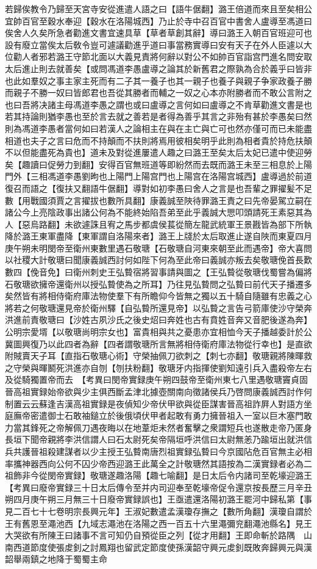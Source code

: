 若歸俟教令乃歸至天宮寺安從進遣人語之曰【語牛倨翻】潞王倍道而來且至矣相公宜帥百官至穀水奉迎【穀水在洛陽城西】乃止於寺中召百官中書舍人盧導至馮道曰俟舍人久矣所急者勸進文書宜速具草【草者草創其辭】導曰潞王入朝百官班迎可也設有廢立當俟太后敎令豈可遽議勸進乎道曰事當務實導曰安有天子在外人臣遽以大位勸人者邪若潞王守節北面以大義見責將何辭以對公不如帥百官詣宫門進名問安取太后進止則去就善矣【或問馮道李愚盧導之論其於新舊君之際孰為合於義乎曰皆非也此如羣奴之事主家主死而有二子其一養子也其一親子也養子與親子争家政養子勝而親子不勝一奴曰皆郎君也吾從其勝者而輔之一奴之心本亦附勝者而不敢公言附之也曰吾將决諸主母馮道李愚之謂也或曰盧導之言何如曰盧導之不肯草勸進文書是也若其持論則猶李愚也至於言去就之善若是者得為善乎其言之非殆有甚於李愚矣曰然則為馮道李愚者當何如曰若漢人之論相主在與在主亡與亡可也然亦僅可而已未能盡相道也夫子之言曰危而不持顛而不扶則將焉用彼相矣明乎此則為相者貴於持危扶顛不以但能盡死為貴也】道未及對從進屢遣人趣之曰潞王至矣太后太妃已遣中使迎勞矣【趣讀曰促勞力到翻】安得百官無班道等即紛然而去既而潞王未至三相息於上陽門外【三相馮道李愚劉昫也上陽門上陽宫門也上陽宫在洛陽宫城西】盧導過於前道復召而語之【復扶又翻語牛倨翻】導對如初李愚曰舍人之言是也吾輩之罪擢髪不足數【用戰國須賈之言擢拔也數所具翻】康義誠至陜待罪潞王責之曰先帝晏駕立嗣在諸公今上亮陰政事出諸公何為不能終始陷吾弟至此乎義誠大愳叩頭請死王素惡其為人【惡烏路翻】未欲遽誅且宥之馬步都虞侯萇從簡左龍武統軍王景戡皆為部下所執降於潞王東軍盡降【東軍謂自洛陽來者】潞王上牋於太后取進止遂自陜而東夏四月庚午朔未明閔帝至衛州東數里遇石敬瑭【石敬瑭自河東來朝至此而遇帝】帝大喜問以社稷大計敬瑭曰聞康義誠西討何如陛下何為至此帝曰義誠亦叛去矣敬瑭俛首長歎數四【俛音免】曰衛州刺史王弘䞇宿將習事請與圖之【王弘䞇從敬瑭伐蜀嘗為偏將石敬瑭欲擁帝還衛州以授弘䞇使為之所耳】乃往見弘䞇問之弘䞇曰前代天子播遷多矣然皆有將相侍衛府庫法物使羣下有所瞻仰今皆無之獨以五十騎自隨雖有忠義之心將若之何敬瑭還見帝於衛州驛【自弘䞇所還見帝】以弘䞇之言告弓箭庫使沙守榮奔洪進前責敬瑭曰【沙姓古夙沙氏之後史炤曰奔姓也古有賁姓音奔又音肥後遂為奔】公明宗愛壻【以敬瑭尚明宗女也】富貴相與共之憂患亦宜相恤今天子播越委計於公冀圖興復乃以此四者為辭【四者謂敬瑭所言無將相侍衛府庫法物從行幸也】是直欲附賊賣天子耳【直指石敬瑭心術】守榮抽佩刀欲刺之【刺七亦翻】敬瑭親將陳暉救之守榮與暉鬭死洪進亦自刎【刎扶粉翻】敬瑭牙内指揮使劉知遠引兵入盡殺帝左右及從騎獨置帝而去　【考異曰閔帝實録庚午朔四鼓帝至衛州東七八里遇敬瑭竇貞固晉高祖實録始帝欲與少主俱西斷孟津北據壺關南向徵諸侯兵乃啓問康義誠西討作何制置云云蘇逢吉漢高祖實録是夜偵知少帝伏甲欲與從臣謀害晉高祖詐屛人對語方坐庭廡帝密遣御士石敢袖鎚立於後俄頃伏甲者起敢有勇力擁晉祖入一室以巨木塞門敢力當其鋒死之帝解佩刀遇夜晦以在地葦炬未然者奮擊之衆謂短兵也遂散走帝乃匿身長垣下聞帝親將李洪信謂人曰石太尉死矣帝隔垣呼洪信曰太尉無恙乃踰垣出就洪信兵共護晉祖殺建謀者以少主授王弘䞇南唐烈祖實録弘䞇曰今京國阽危百官無主必相率攜神器西向公何不囚少帝西迎潞王此萬全之計敬瑭然其語按為二漢實録者必為二祖飾非今從閔帝實録】敬瑭遂趣洛陽【趣七喻翻】是日太后令内諸司至乾壕迎潞王【考異曰廢帝實録三十日太后傳令至并内司迎奉至乾壕帝促令還京按長歷三月辛丑朔四月庚午朔三月無三十日廢帝實録誤也】王亟遣還洛陽初潞王罷河中歸私第【事見二百七十七卷明宗長興元年】王淑妃數遣孟漢瓊存撫之【數所角翻】漢瓊自謂於王有舊恩至澠池西【九域志澠池在洛陽之西一百五十六里澠彌兖翻澠池縣名】見王大哭欲有所陳王曰諸事不言可知仍自預從臣之列【從才用翻】王即命斬於路隅　山南西道節度使張䖍釗之討鳳翔也留武定節度使孫漢韶守興元䖍釗既敗奔歸興元與漢韶舉兩鎮之地降于蜀蜀主命